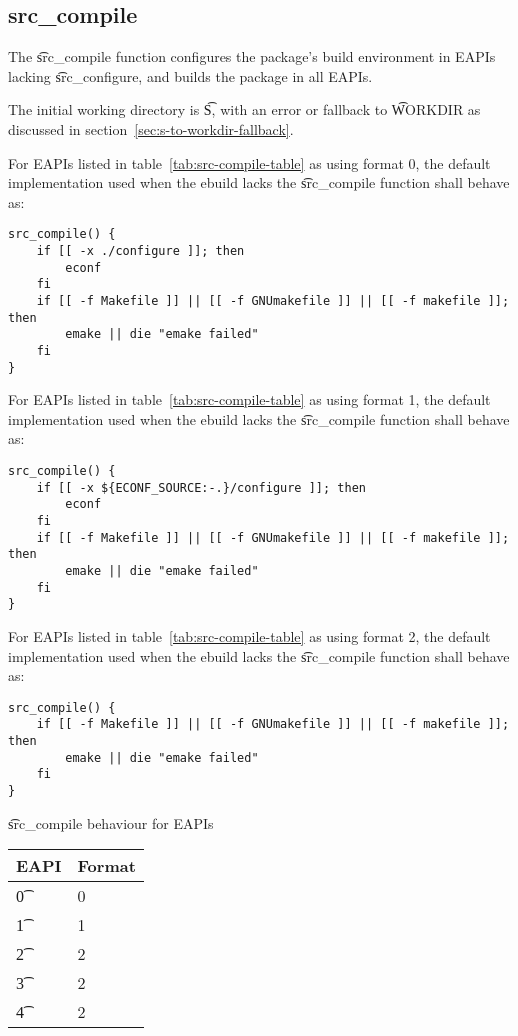 \subsection{src\_compile}
\label{sec:src-compile-function}

 The \t{src\_compile} function configures the package's build environment
in EAPIs lacking \t{src\_configure}, and builds the package in all EAPIs.

The initial working directory is \t{S}, with an error or fallback to \t{WORKDIR} as discussed in
section~\ref{sec:s-to-workdir-fallback}.

 For EAPIs listed in table~\ref{tab:src-compile-table} as using format
0, the default implementation used when the ebuild lacks the \t{src\_compile} function shall behave
as:

\begin{verbatim}
src_compile() {
    if [[ -x ./configure ]]; then
        econf
    fi
    if [[ -f Makefile ]] || [[ -f GNUmakefile ]] || [[ -f makefile ]]; then
        emake || die "emake failed"
    fi
}
\end{verbatim}

 For EAPIs listed in table~\ref{tab:src-compile-table} as using format
1, the default implementation used when the ebuild lacks the \t{src\_compile} function shall behave
as:

\begin{verbatim}
src_compile() {
    if [[ -x ${ECONF_SOURCE:-.}/configure ]]; then
        econf
    fi
    if [[ -f Makefile ]] || [[ -f GNUmakefile ]] || [[ -f makefile ]]; then
        emake || die "emake failed"
    fi
}
\end{verbatim}

 For EAPIs listed in table~\ref{tab:src-compile-table} as using format
2, the default implementation used when the ebuild lacks the \t{src\_compile} function shall behave
as:

\begin{verbatim}
src_compile() {
    if [[ -f Makefile ]] || [[ -f GNUmakefile ]] || [[ -f makefile ]]; then
        emake || die "emake failed"
    fi
}
\end{verbatim}

\begin{centertable}{\t{src\_compile} behaviour for EAPIs} \label{tab:src-compile-table}
    \begin{tabular}{ l l }
        \toprule
        \multicolumn{1}{c}{\textbf{EAPI}} &
        \multicolumn{1}{c}{\textbf{Format}} \\
        \midrule
    \t{0} & 0 \\
    \t{1} & 1 \\
    \t{2} & 2 \\
    \t{3} & 2 \\
    \t{4} & 2 \\
    \bottomrule
    \end{tabular}
\end{centertable}

